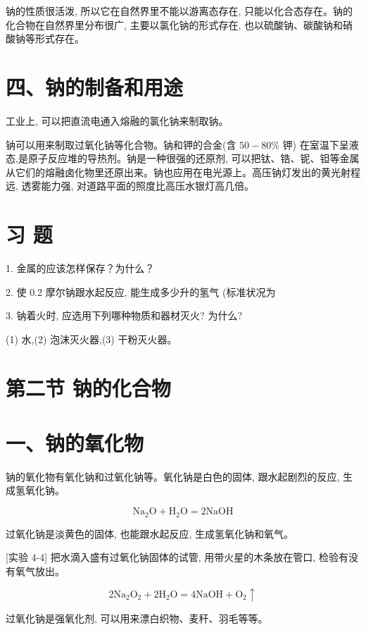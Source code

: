 \documentclass[10pt]{article}
\begin{document}
钠的性质很活泼, 所以它在自然界里不能以游离态存在, 只能以化合态存在。钠的化合物在自然界里分布很广, 主要以氯化钠的形式存在, 也以硫酸钠、碳酸钠和硝酸钠等形式存在。

\section*{四、钠的制备和用途}

工业上, 可以把直流电通入熔融的氯化钠来制取钠。

钠可以用来制取过氧化钠等化合物。钠和钾的合金(含 \({50} - {80}\%\) 钾) 在室温下呈液态,是原子反应堆的导热剂。钠是一种很强的还原剂, 可以把钛、锆、铌、钽等金属从它们的熔融卤化物里还原出来。钠也应用在电光源上。高压钠灯发出的黄光射程远, 透雾能力强, 对道路平面的照度比高压水银灯高几倍。

\section*{习 题}

1. 金属的应该怎样保存？为什么？

2. 使 0.2 摩尔钠跟水起反应, 能生成多少升的氢气 (标准状况为

3. 钠着火时, 应选用下列哪种物质和器材灭火? 为什么?

(1) 水,(2) 泡沫灭火器,(3) 干粉灭火器。

\section*{第二节 钠的化合物}

\section*{一、钠的氧化物}

钠的氧化物有氧化钠和过氧化钠等。氧化钠是白色的固体, 跟水起剧烈的反应, 生成氢氧化钠。

\[
{\mathrm{{Na}}}_{2}\mathrm{O} + {\mathrm{H}}_{2}\mathrm{O} = 2\mathrm{{NaOH}}
\]

过氧化钠是淡黄色的固体, 也能跟水起反应, 生成氢氧化钠和氧气。

[实验 4-4] 把水滴入盛有过氧化钠固体的试管, 用带火星的木条放在管口, 检验有没有氧气放出。

\[
2{\mathrm{{Na}}}_{2}{\mathrm{O}}_{2} + 2{\mathrm{H}}_{2}\mathrm{O} = 4\mathrm{{NaOH}} + {\mathrm{O}}_{2} \uparrow
\]

过氧化钠是强氧化剂, 可以用来漂白织物、麦秆、羽毛等等。
\end{document}
